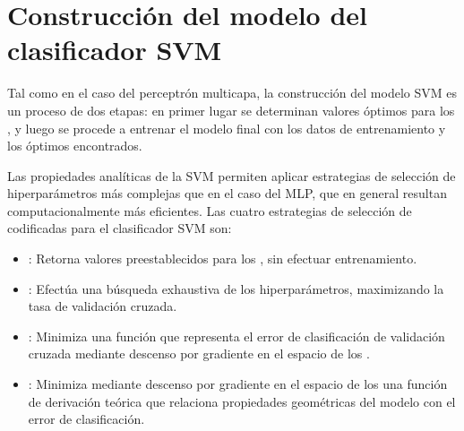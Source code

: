 %
%
\section{Construcción del modelo del clasificador SVM}
%
Tal como en el caso del perceptrón multicapa, la construcción del
modelo SVM es un proceso de dos etapas: en primer lugar se determinan
valores óptimos para los , y luego se procede a entrenar el
modelo final con los datos de entrenamiento y los  óptimos
encontrados.

Las propiedades analíticas de la SVM permiten aplicar estrategias de
selección de hiperparámetros más complejas que en el caso del MLP, que
en general resultan computacionalmente más eficientes.
Las cuatro estrategias de selección de  codificadas para el
clasificador SVM son:
%
\begin{itemize}
\item
  : Retorna valores preestablecidos para los
  , sin efectuar entrenamiento.
\item
  : Efectúa una búsqueda exhaustiva de los
  hiperparámetros, maximizando la tasa \GM{} de validación cruzada.
\item
  : Minimiza una función que
  representa el error de clasificación de validación cruzada mediante
  descenso por gradiente en el espacio de los .
\item
  : Minimiza mediante descenso
  por gradiente en el espacio de los  una función de
  derivación teórica que relaciona propiedades geométricas del modelo
  con el error de clasificación.
\end{itemize}
%
